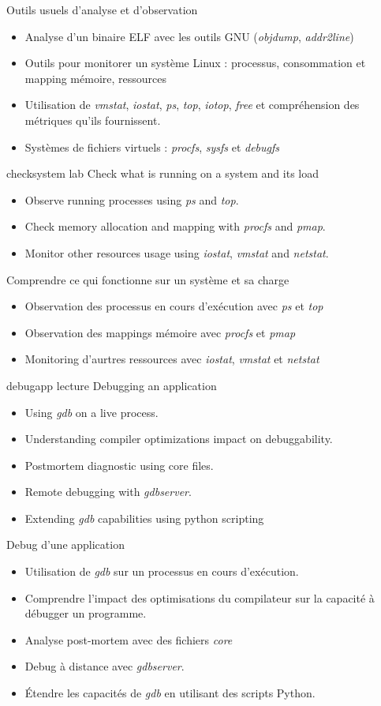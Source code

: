 {Outils usuels d'analyse et d'observation}
{
  \begin{itemize}
  \item Analyse d'un binaire ELF avec les outils GNU ({\em objdump},
    {\em addr2line})
  \item Outils pour monitorer un système Linux : processus,
    consommation et mapping mémoire, ressources
  \item Utilisation de {\em vmstat}, {\em iostat}, {\em ps}, {\em
      top}, {\em iotop}, {\em free} et compréhension des métriques
    qu'ils fournissent.
  \item Systèmes de fichiers virtuels : {\em procfs}, {\em sysfs} et
    {\em debugfs}
  \end{itemize}
}
{checksystem}
{lab}
{Check what is running on a system and its load}
{
  \begin{itemize}
  \item Observe running processes using {\em ps} and {\em top}.
  \item Check memory allocation and mapping with {\em procfs} and {\em
      pmap}.
  \item Monitor other resources usage using {\em iostat}, {\em vmstat}
    and {\em netstat}.
  \end{itemize}
}
{Comprendre ce qui fonctionne sur un système et sa charge}
{
  \begin{itemize}
  \item Observation des processus en cours d'exécution avec {\em ps} et {\em top}
  \item Observation des mappings mémoire avec {\em procfs} et {\em pmap}
  \item Monitoring d'aurtres ressources avec {\em iostat}, {\em
      vmstat} et {\em netstat}
 \end{itemize}
}
{debugapp}
{lecture}
{Debugging an application}
{
  \begin{itemize}
  \item Using {\em gdb} on a live process.
  \item Understanding compiler optimizations impact on debuggability.
  \item Postmortem diagnostic using core files.
  \item Remote debugging with {\em gdbserver}.
  \item Extending {\em gdb} capabilities using python scripting
  \end{itemize}
}
{Debug d'une application}
{
  \begin{itemize}
  \item Utilisation de {\em gdb} sur un processus en cours d'exécution.
  \item Comprendre l'impact des optimisations du compilateur sur la
    capacité à débugger un programme.
  \item Analyse post-mortem avec des fichiers {\em core}
  \item Debug à distance avec {\em gdbserver}.
  \item Étendre les capacités de {\em gdb} en utilisant des scripts
    Python.
  \end{itemize}
}
